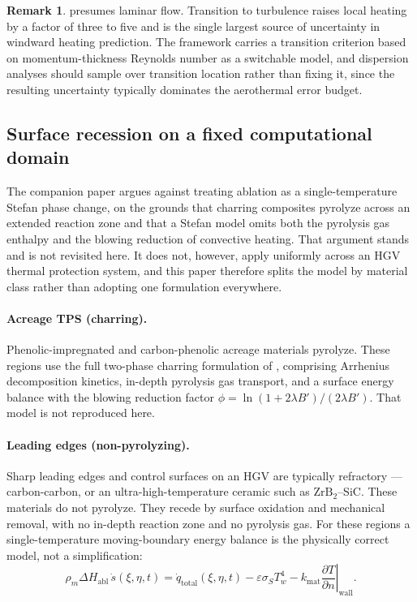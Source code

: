 \documentclass[11pt,a4paper]{article}
\theoremstyle{definition}
\newtheorem{remark}[theorem]{Remark}
\numberwithin{equation}{section}
\begin{document}
\begin{remark}
 presumes laminar flow. Transition to turbulence raises local heating by a factor of three to five and is the single largest source of uncertainty in windward heating prediction. The framework carries a transition criterion based on momentum-thickness Reynolds number as a switchable model, and dispersion analyses should sample over transition location rather than fixing it, since the resulting uncertainty typically dominates the aerothermal error budget.
\end{remark}

\subsection{Surface recession on a fixed computational domain}
\label{sec:ablation}

The companion paper \cite{knox2026passes} argues against treating ablation as a single-temperature Stefan phase change, on the grounds that charring composites pyrolyze across an extended reaction zone and that a Stefan model omits both the pyrolysis gas enthalpy and the blowing reduction of convective heating. That argument stands and is not revisited here. It does not, however, apply uniformly across an HGV thermal protection system, and this paper therefore splits the model by material class rather than adopting one formulation everywhere.

\paragraph{Acreage TPS (charring).} Phenolic-impregnated and carbon-phenolic acreage materials pyrolyze. These regions use the full two-phase charring formulation of \cite{knox2026passes}, comprising Arrhenius decomposition kinetics, in-depth pyrolysis gas transport, and a surface energy balance with the blowing reduction factor $\phi = \ln(1+2\lambda B')/(2\lambda B')$. That model is not reproduced here.

\paragraph{Leading edges (non-pyrolyzing).} Sharp leading edges and control surfaces on an HGV are typically refractory --- carbon-carbon, or an ultra-high-temperature ceramic such as $\text{ZrB}_2$--SiC. These materials do not pyrolyze. They recede by surface oxidation and mechanical removal, with no in-depth reaction zone and no pyrolysis gas. For these regions a single-temperature moving-boundary energy balance is the physically correct model, not a simplification:
\begin{equation}
\label{eq:stefan}
\rho_m \Delta H_{\text{abl}}\, \dot{s}(\xi,\eta,t)
= \dot{q}_{\text{total}}(\xi,\eta,t)
- \varepsilon \sigma_{\!S} T_w^4
- k_{\text{mat}} \left.\frac{\partial T}{\partial n}\right|_{\text{wall}} .
\end{equation}
\end{document}
